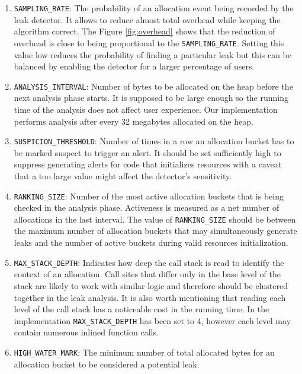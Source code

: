 \documentclass[preprint, numbers]{sigplanconf}
\begin{document}
\begin{enumerate}

\item \texttt{SAMPLING\_RATE}: The probability of an allocation
	event being recorded by the leak detector.
	It allows to reduce almost total overhead while keeping the algorithm correct.
	The Figure \ref{fig:overhead} shows that the reduction of overhead is close
	to being proportional to the \texttt{SAMPLING\_RATE}.
	Setting this value low reduces the probability of finding a particular leak
	but this can be balanced by enabling the detector for a larger percentage of users.

\item \texttt{ANALYSIS\_INTERVAL}: Number of bytes to be allocated on the heap before the next
	analysis phase starts.
	It is supposed to be large enough so the running time of the analysis does not
	affect user experience.
	Our implementation performs analysis after every 32 megabytes allocated
	on the heap.

\item \texttt{SUSPICION\_THRESHOLD}: Number of times in a row an allocation bucket
	has to be marked suspect to trigger an alert.
	It should be set sufficiently high to suppress generating alerts for code that initializes resources
	with a caveat that a too large value might affect the detector's sensitivity.

\item \texttt{RANKING\_SIZE}: Number of the most active allocation buckets
	that is being checked in the analysis phase.
	Activeness is measured as a net number of allocations in the last interval.
	The value of \texttt{RANKING\_SIZE} should be between the maximum number
	of allocation buckets that may simultaneously generate leaks and the
	number of active buckets during valid resources initialization.

\item \texttt{MAX\_STACK\_DEPTH}: Indicates how deep the call stack is read to
	identify the context of an allocation.
	Call sites that differ only in the base level of the stack are likely to
	work with similar logic and therefore should be clustered together
	in the leak analysis.
	It is also worth mentioning that reading each level of the call stack
	has a noticeable cost in the running time.
	In the implementation \texttt{MAX\_STACK\_DEPTH} has been set to 4,
	however each level may contain numerous inlined function calls.

\item \texttt{HIGH\_WATER\_MARK}: The minimum number of total allocated bytes for an
	allocation bucket to be considered a potential leak.

\end{enumerate}
\end{document}
